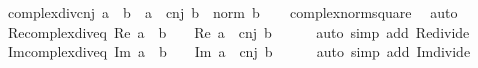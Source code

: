\begin{isabellebody}
%
\isadelimproof
\isanewline
%
\endisadelimproof
\isanewline
{}\isamarkupfalse%
\ complex{\isacharunderscore}{\kern0pt}div{\isacharunderscore}{\kern0pt}cnj{\isacharcolon}{\kern0pt}\ {\isachardoublequoteopen}a\ {\isacharslash}{\kern0pt}\ b\ {\isacharequal}{\kern0pt}\ {\isacharparenleft}{\kern0pt}a\ {\isacharasterisk}{\kern0pt}\ cnj\ b{\isacharparenright}{\kern0pt}\ {\isacharslash}{\kern0pt}\ {\isacharparenleft}{\kern0pt}norm\ b{\isacharparenright}{\kern0pt}\isanewline
%
\isadelimproof
\ \ %
\endisadelimproof
%
\isatagproof
{}\isamarkupfalse%
\ complex{\isacharunderscore}{\kern0pt}norm{\isacharunderscore}{\kern0pt}square\ \isamarkupfalse%
\ auto%
\endisatagproof
{\isafoldproof}%
%
\isadelimproof
\isanewline
%
\endisadelimproof
\isanewline
{}\isamarkupfalse%
\ Re{\isacharunderscore}{\kern0pt}complex{\isacharunderscore}{\kern0pt}div{\isacharunderscore}{\kern0pt}eq{\isacharunderscore}{\kern0pt}{}{\isacharcolon}{\kern0pt}\ {\isachardoublequoteopen}Re\ {\isacharparenleft}{\kern0pt}a\ {\isacharslash}{\kern0pt}\ b{\isacharparenright}{\kern0pt}\ {\isacharequal}{\kern0pt}\ {}\ {\isasymlongleftrightarrow}\ Re\ {\isacharparenleft}{\kern0pt}a\ {\isacharasterisk}{\kern0pt}\ cnj\ b{\isacharparenright}{\kern0pt}\ {\isacharequal}{\kern0pt}\ {}{\isachardoublequoteclose}\isanewline
%
\isadelimproof
\ \ %
\endisadelimproof
%
\isatagproof
{}\isamarkupfalse%
\ {\isacharparenleft}{\kern0pt}auto\ simp\ add{\isacharcolon}{\kern0pt}\ Re{\isacharunderscore}{\kern0pt}divide{\isacharparenright}{\kern0pt}%
\endisatagproof
{\isafoldproof}%
%
\isadelimproof
\isanewline
%
\endisadelimproof
\isanewline
{}\isamarkupfalse%
\ Im{\isacharunderscore}{\kern0pt}complex{\isacharunderscore}{\kern0pt}div{\isacharunderscore}{\kern0pt}eq{\isacharunderscore}{\kern0pt}{}{\isacharcolon}{\kern0pt}\ {\isachardoublequoteopen}Im\ {\isacharparenleft}{\kern0pt}a\ {\isacharslash}{\kern0pt}\ b{\isacharparenright}{\kern0pt}\ {\isacharequal}{\kern0pt}\ {}\ {\isasymlongleftrightarrow}\ Im\ {\isacharparenleft}{\kern0pt}a\ {\isacharasterisk}{\kern0pt}\ cnj\ b{\isacharparenright}{\kern0pt}\ {\isacharequal}{\kern0pt}\ {}{\isachardoublequoteclose}\isanewline
%
\isadelimproof
\ \ %
\endisadelimproof
%
\isatagproof
{}\isamarkupfalse%
\ {\isacharparenleft}{\kern0pt}auto\ simp\ add{\isacharcolon}{\kern0pt}\ Im{\isacharunderscore}{\kern0pt}divide{\isacharparenright}{\kern0pt}%
\endisatagproof
{\isafoldproof}%

\end{isabellebody}
